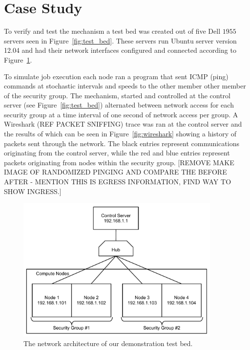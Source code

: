 \documentclass[oneside,12pt]{memoir}
\begin{document}
\section{Case Study}
To verify and test the mechanism a test bed was created out of five Dell $1955$ servers seen in Figure~\ref{fig:test_bed}. These servers run Ubuntu server version 12.04 and had their network interfaces configured and connected according to Figure~\ref{fig:tdm_demo_setup}. 

To simulate job execution each node ran a program that sent ICMP (ping) commands at stochastic intervals and speeds to the other member other member of the security group. The mechanism, started and controlled at the control server (see Figure~\ref{fig:test_bed}) alternated between network access for each security group at a time interval of one second of network access per group. A Wireshark (REF PACKET SNIFFING) trace was ran at the control server and the results of which can be seen in Figure~\ref{fig:wireshark} showing a history of packets sent through the network. The black entries represent communications originating from the control server, while the red and blue entries represent packets originating from nodes within the security group. [REMOVE MAKE IMAGE OF RANDOMIZED PINGING AND COMPARE THE BEFORE AFTER - MENTION THIS IS EGRESS INFORMATION, FIND WAY TO SHOW INGRESS.]
\begin{figure}
  \begin{center}
    \includegraphics[width=0.9\textwidth]{tdm_demo_setup.pdf}
  \end{center}
  \caption{The network architecture of our demonstration test bed.}
\label{fig:tdm_demo_setup}
\end{figure}
\end{document}
